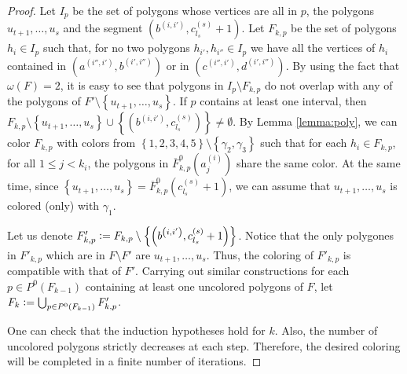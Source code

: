\documentclass[12pt]{article}
\theoremstyle{definition}
\newcommand{\defeq}{\vcentcolon=}
\begin{document}
\begin{proof}
         Let $I_{p}$ be the set of polygons
         whose vertices are all
         in $p$, the polygons
         $u_{t+1}, \ldots, u_{s}$ and 
         the segment $\left(b^{\left(i, i'\right)},
         c_{l_{s}}^{\left(s\right)} + 1\right)$.
         Let $F_{k, p}$ be the set of
         polygons $h_{i} \in I_{p}$ 
         such that, for no two polygons
         $h_{i'}, h_{i''} \in I_{p}$
         we have all the vertices
         of $h_{i}$ contained in
         $\left(a^{\left(i'', i'\right)},
         b^{\left(i', i''\right)}\right)$ 
         or in
         $\left(c^{\left(i'',i'\right)}, 
         d^{\left(i',i''\right)}\right)$.
         By using the fact
         that $\omega\left(F\right) = 2$,
         it is easy to see that 
         polygons in $I_{p} \setminus F_{k, p}$ 
         do not overlap with 
         any of the polygons of
         $F' \setminus \left\{u_{t+1}, \ldots
         , u_{s}\right\}$.
         If $p$ contains at least
         one interval, 
         then 
         $F_{k, p} \setminus 
         \left\{u_{t + 1}, \ldots,
         u_{s}\right\} \cup 
         \left\{ \left(b^{\left(i, i'\right)}, 
         c_{l_{s}}^{\left(s\right)}\right)\right\}
         \neq \emptyset$.
         By Lemma \ref{lemma:poly},
         we can color $F_{k, p}$ with
         colors from 
         $\left\{1, 2, 3, 4, 5\right\} \setminus 
         \left\{\gamma_2, \gamma_3\right\}$
         such that for each $h_{i} \in F_{k, p}$,
         for all
         $1 \leq j < k_{i}$, the polygons in
         $\overline{F}_{k, p}^{0}\left(a_{j}^{\left(i\right)}\right)$ 
         share the same color. At the same time,
         since $\left\{u_{t +1}, \ldots, u_{s}\right\} = 
         \overline{F}_{k, p}^{0}\left(c_{l_{s}}^{\left(s\right)} + 1\right)$,
         we can assume that $u_{t + 1}, \ldots, u_{s}$ 
         is colored (only) with $\gamma_1$.

         Let us denote $F'_{k, p} \defeq
         F_{k, p} \setminus \left\{\left(
         b^{\left(i, i'\right)},
         c_{l_{s}}^{\left(s\right)} + 1\right)\right\}$.
         Notice that the only
         polygones in $F'_{k, p}$ 
         which are in $F \setminus F'$ 
         are $u_{t + 1}, \ldots, u_{s}$.
         Thus, the coloring of
         $F'_{k, p}$ is compatible with that 
         of $F'$. Carrying out similar 
         constructions for each 
         $p \in P^{0}\left(F_{k-1}\right)$ 
         containing at least one uncolored
         polygons of $F$, let 
         $F_{k} \defeq \bigcup_{p \in P^{0}\left(F_{k -1}\right)}
         F'_{k, p}$.

         One can check that the induction
         hypotheses hold for $k$.
         Also, the number of uncolored polygons
         strictly decreases at each step.
         Therefore, the desired coloring will be completed
         in a finite number of iterations.
     \end{proof}    
     
     \printbibliography
\end{document}
